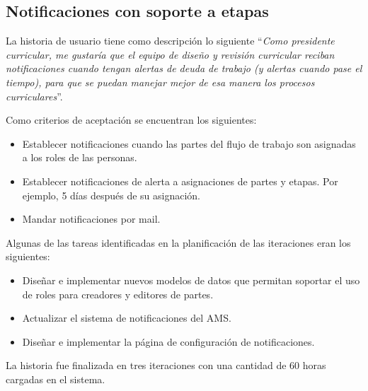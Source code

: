 \subsection{Notificaciones con soporte a etapas}
La historia de usuario tiene como descripción lo siguiente \enquote{\textit{Como presidente curricular, me gustaría que el equipo de diseño y revisión curricular reciban notificaciones cuando tengan alertas de deuda de trabajo (y alertas cuando pase el tiempo), para que se puedan manejar mejor de esa manera los procesos curriculares}}.

Como criterios de aceptación se encuentran los siguientes:
\begin{itemize}
	\item Establecer notificaciones cuando las partes del flujo de trabajo son asignadas a los roles de las personas.
	\item Establecer notificaciones de alerta a asignaciones de partes y etapas. Por ejemplo, 5 días después de su asignación.
	\item Mandar notificaciones por mail.
\end{itemize}

Algunas de las tareas identificadas en la planificación de las iteraciones eran los siguientes:
\begin{itemize}
	\item Diseñar e implementar nuevos modelos de datos que permitan soportar el uso de roles para creadores y editores de partes.
	\item Actualizar el sistema de notificaciones del AMS.
	\item Diseñar e implementar la página de configuración de notificaciones.
\end{itemize}

La historia fue finalizada en tres iteraciones con una cantidad de 60 horas cargadas en el sistema.